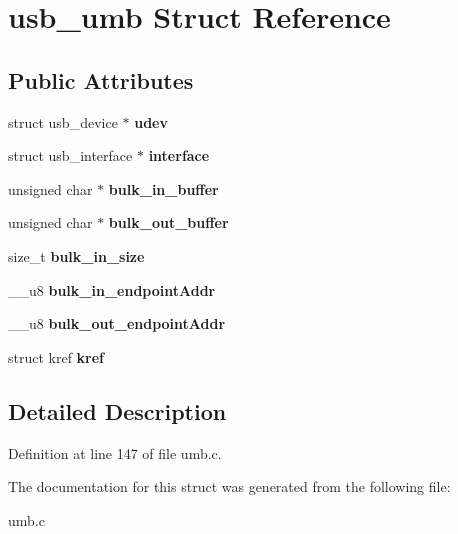 \hypertarget{structusb__umb}{\section{usb\-\_\-umb Struct Reference}
\label{structusb__umb}
}
\subsection*{Public Attributes}
\begin{DoxyCompactItemize}
\item 
\hypertarget{structusb__umb_ac7107e9983bbc34369971ab7f5197774}{struct usb\-\_\-device $\ast$ {\bfseries udev}}\label{structusb__umb_ac7107e9983bbc34369971ab7f5197774}

\item 
\hypertarget{structusb__umb_afe2690db77b9931cbad3bf9b685e9d15}{struct usb\-\_\-interface $\ast$ {\bfseries interface}}\label{structusb__umb_afe2690db77b9931cbad3bf9b685e9d15}

\item 
\hypertarget{structusb__umb_aa916ba72fca326d918395b710037d1f2}{unsigned char $\ast$ {\bfseries bulk\-\_\-in\-\_\-buffer}}\label{structusb__umb_aa916ba72fca326d918395b710037d1f2}

\item 
\hypertarget{structusb__umb_acead24382d487d0b6a4b964fb2e82a98}{unsigned char $\ast$ {\bfseries bulk\-\_\-out\-\_\-buffer}}\label{structusb__umb_acead24382d487d0b6a4b964fb2e82a98}

\item 
\hypertarget{structusb__umb_a45475e95cf59314e7a8890254fbd0100}{size\-\_\-t {\bfseries bulk\-\_\-in\-\_\-size}}\label{structusb__umb_a45475e95cf59314e7a8890254fbd0100}

\item 
\hypertarget{structusb__umb_a137ea087dfeba25c1eb72f17be5d1418}{\-\_\-\-\_\-u8 {\bfseries bulk\-\_\-in\-\_\-endpoint\-Addr}}\label{structusb__umb_a137ea087dfeba25c1eb72f17be5d1418}

\item 
\hypertarget{structusb__umb_a5a149d2a34c2b0493172f784bf022dc0}{\-\_\-\-\_\-u8 {\bfseries bulk\-\_\-out\-\_\-endpoint\-Addr}}\label{structusb__umb_a5a149d2a34c2b0493172f784bf022dc0}

\item 
\hypertarget{structusb__umb_a7a9044de470e8b09233e826ffc3e42d4}{struct kref {\bfseries kref}}\label{structusb__umb_a7a9044de470e8b09233e826ffc3e42d4}

\end{DoxyCompactItemize}


\subsection{Detailed Description}


Definition at line 147 of file umb.\-c.



The documentation for this struct was generated from the following file\-:\begin{DoxyCompactItemize}
\item 
umb.\-c\end{DoxyCompactItemize}
